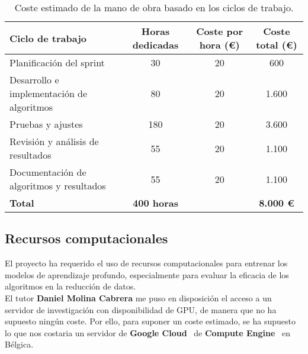 \begin{table}[htp]\label{tab:mano-de-obra}
  \centering
  \begin{adjustbox}{width=\linewidth}
    \begin{tabular}{|l|c|c|c|}
      \hline
      \textbf{Ciclo de trabajo}                 & \textbf{Horas dedicadas} & \textbf{Coste por hora (€)} &
      \textbf{Coste total (€)}                                                                                              \\ \hline
      Planificación del sprint                  & 30                       & 20                          & 600              \\
      Desarrollo e implementación de algoritmos & 80                       & 20                          & 1.600            \\
      Pruebas y ajustes                         & 180                      & 20                          & 3.600            \\
      Revisión y análisis de resultados         & 55                       & 20                          & 1.100            \\
      Documentación de algoritmos y resultados  & 55                       & 20                          & 1.100            \\ \hline
      \textbf{Total}                            & \textbf{400 horas}       &                             & \textbf{8.000 €} \\ \hline
    \end{tabular}
  \end{adjustbox}
  \caption{Coste estimado de la mano de obra basado en los ciclos de trabajo.}
\end{table}


\subsection{Recursos computacionales}\label{subsec:recursos-computacionales}
El proyecto ha requerido el uso de recursos computacionales para entrenar los modelos de aprendizaje profundo,
especialmente para evaluar la eficacia de los algoritmos en la reducción de datos. \\[6pt]

El tutor \textbf{Daniel Molina Cabrera} me puso en disposición el acceso a un servidor de investigación con
disponibilidad de GPU, de manera que no ha supuesto ningún coste.
Por ello, para suponer un coste estimado, se ha supuesto lo que nos costaria un servidor de
\textbf{Google Cloud}~\cite{noauthor_overview_nodate} de \textbf{Compute Engine}~\cite{noauthor_what_nodate} en
Bélgica. \\[6pt]

